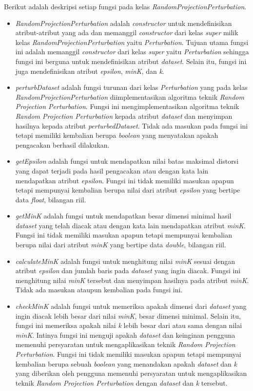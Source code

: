 Berikut adalah deskripsi setiap fungsi pada kelas \textit{RandomProjectionPerturbation}.
\begin{itemize}
	\item \textit{RandomProjectionPerturbation} adalah \textit{constructor} untuk mendefinisikan atribut-atribut yang ada dan memanggil \textit{constructor} dari kelas \textit{super} milik kelas \textit{RandomProjectionPerturbation} yaitu \textit{Perturbation}. Tujuan utama fungsi ini adalah memanggil \textit{constructor} dari kelas \textit{super} yaitu \textit{Perturbation} sehingga fungsi ini berguna untuk mendefinisikan atribut \textit{\textit{dataset}}. Selain itu, fungsi ini juga mendefinisikan atribut \textit{epsilon}, \textit{minK}, dan \textit{k}.
	\item \textit{perturbDataset} adalah fungsi turunan dari kelas \textit{Perturbation} yang pada kelas \textit{RandomProjectionPerturbation} diimplementasikan algoritma teknik \textit{Random Projection Perturbation}. Fungsi ini mengimplementasikan algoritma teknik \textit{Random Projection Perturbation} kepada atribut \textit{\textit{dataset}} dan menyimpan hasilnya kepada atribut \textit{perturbedDataset}. Tidak ada masukan pada fungsi ini tetapi memiliki kembalian berupa \textit{boolean} yang menyatakan apakah pengacakan berhasil dilakukan.
	\item \textit{getEpsilon} adalah fungsi untuk mendapatkan nilai batas maksimal distorsi yang dapat terjadi pada hasil pengacakan atau dengan kata lain mendapatkan atribut \textit{epsilon}. Fungsi ini tidak memiliki masukan apapun tetapi mempunyai kembalian berupa nilai dari atribut \textit{epsilon} yang bertipe data \textit{float}, bilangan riil.
	\item \textit{getMinK} adalah fungsi untuk mendapatkan besar dimensi minimal hasil \textit{dataset} yang telah diacak atau dengan kata lain mendapatkan atribut \textit{minK}. Fungsi ini tidak memiliki masukan apapun tetapi mempunyai kembalian berupa nilai dari atribut \textit{minK} yang bertipe data \textit{double}, bilangan riil.
	\item \textit{calculateMinK} adalah fungsi untuk menghitung nilai \textit{minK} sesuai dengan atribut \textit{epsilon} dan jumlah baris pada \textit{dataset} yang ingin diacak. Fungsi ini menghitung nilai \textit{minK} tersebut dan menyimpan hasilnya pada atribut \textit{minK}. Tidak ada masukan ataupun kembalian pada fungsi ini.
	\item \textit{checkMinK} adalah fungsi untuk memeriksa apakah dimensi dari \textit{\textit{dataset}} yang ingin diacak lebih besar dari nilai \textit{minK}, besar dimensi minimal. Selain itu, fungsi ini memeriksa apakah nilai \textit{k} lebih besar dari atau sama dengan nilai \textit{minK}. Intinya fungsi ini menguji apakah \textit{dataset} dan keinginan pengguna memenuhi persyaratan untuk mengaplikasikan teknik \textit{Random Projection Perturbation}. Fungsi ini tidak memiliki masukan apapun tetapi mempunyai kembalian berupa sebuah \textit{boolean} yang menandakan apakah \textit{\textit{dataset}} dan \textit{k} yang diberikan oleh pengguna memenuhi persyaratan untuk mengaplikasikan teknik \textit{Random Projection Perturbation} dengan \textit{\textit{dataset}} dan \textit{k} tersebut.

\end{itemize}
